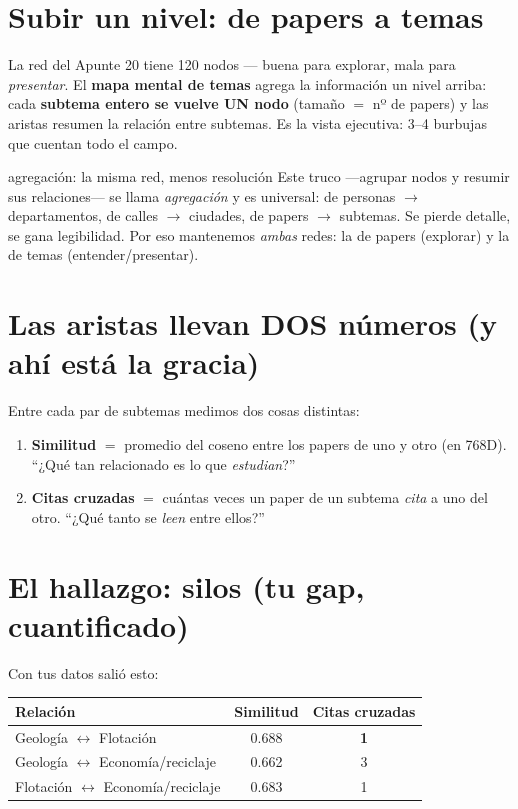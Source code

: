 \documentclass[11pt,a4paper]{article}
\begin{document}

\section{Subir un nivel: de papers a temas}

La red del Apunte 20 tiene 120 nodos — buena para explorar, mala para \emph{presentar}.
El \textbf{mapa mental de temas} agrega la información un nivel arriba: cada
\textbf{subtema entero se vuelve UN nodo} (tamaño $=$ nº de papers) y las aristas resumen
la relación entre subtemas. Es la vista ejecutiva: 3--4 burbujas que cuentan todo el campo.

\begin{concepto}{agregación: la misma red, menos resolución}
Este truco —agrupar nodos y resumir sus relaciones— se llama \emph{agregación} y es
universal: de personas $\rightarrow$ departamentos, de calles $\rightarrow$ ciudades, de
papers $\rightarrow$ subtemas. Se pierde detalle, se gana legibilidad. Por eso mantenemos
\emph{ambas} redes: la de papers (explorar) y la de temas (entender/presentar).
\end{concepto}

\section{Las aristas llevan DOS números (y ahí está la gracia)}

Entre cada par de subtemas medimos dos cosas distintas:
\begin{enumerate}
  \item \textbf{Similitud} $=$ promedio del coseno entre los papers de uno y otro (en 768D).
        ``¿Qué tan relacionado es lo que \emph{estudian}?''
  \item \textbf{Citas cruzadas} $=$ cuántas veces un paper de un subtema \emph{cita} a uno
        del otro. ``¿Qué tanto se \emph{leen} entre ellos?''
\end{enumerate}

\section{El hallazgo: silos (tu gap, cuantificado)}

Con tus datos salió esto:

\begin{center}
\begin{tabular}{lcc}
\textbf{Relación} & \textbf{Similitud} & \textbf{Citas cruzadas} \\
\hline
Geología $\leftrightarrow$ Flotación & 0.688 & \textbf{1} \\
Geología $\leftrightarrow$ Economía/reciclaje & 0.662 & 3 \\
Flotación $\leftrightarrow$ Economía/reciclaje & 0.683 & 1 \\
\end{tabular}
\end{center}
\end{document}
